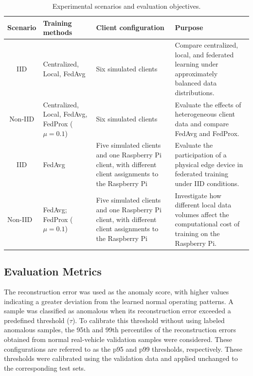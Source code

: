 \documentclass[12pt]{article}
\begin{document}
	\begin{table}[h!]
		\centering
		\caption{Experimental scenarios and evaluation objectives.}
		\label{tab:experimental_scenarios}
		\begin{tabularx}{\columnwidth}{|c|>{\hsize=0.9\hsize\raggedright\arraybackslash}X|>{\hsize=0.9\hsize\raggedright\arraybackslash}X|>{\hsize=1.2\hsize\raggedright\arraybackslash}X|}
			\toprule
			\textbf{Scenario}             & \textbf{Training methods}                       & \textbf{Client configuration}                                                                             & \textbf{Purpose}                                                                                \\ \midrule
			IID                           & Centralized, Local, FedAvg                      & Six simulated clients                                                                                     & Compare centralized, local, and federated learning under approximately balanced data distributions.         \\ \midrule
			Non-IID                       & Centralized, Local, FedAvg, FedProx ($\mu=0.1$) & Six simulated clients                                                                                     & Evaluate the effects of heterogeneous client data and compare FedAvg and FedProx.                           \\ \midrule
			IID                           & FedAvg                                          & Five simulated clients and one Raspberry Pi client, with different client assignments to the Raspberry Pi                                                      & Evaluate the participation of a physical edge device in federated training under IID conditions.           \\ \midrule
			\multicolumn{1}{|l|}{Non-IID} & FedAvg; FedProx ($\mu=0.1$)                     & Five simulated clients and one Raspberry Pi client, with different client assignments to the Raspberry Pi & Investigate how different local data volumes affect the computational cost of training on the Raspberry Pi. \\ \bottomrule
		\end{tabularx}
	\end{table}

\subsection{Evaluation Metrics}

\label{subsec:evaluation_metrics}
The reconstruction error was used as the anomaly score, with higher values indicating a greater deviation from the learned normal operating patterns. A sample was classified as anomalous when its reconstruction error exceeded a predefined threshold ($\tau$). To calibrate this threshold without using labeled anomalous samples, the 95th and 99th percentiles of the reconstruction errors obtained from normal real-vehicle validation samples were considered. These configurations are referred to as the p95 and p99 thresholds, respectively. These thresholds were calibrated using the validation data and applied unchanged to the corresponding test sets.
\end{document}
